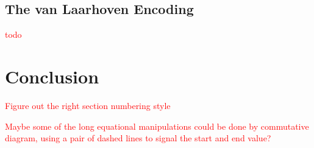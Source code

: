 \documentclass[11pt,a4paper]{article}
\makeatletter
\theoremstyle{plain}
\newtheorem{theorem}{Theorem}[subsection]
\theoremstyle{definition}
\newcommand{\C}{\mathscr{C}}
\newcommand{\id}{\mathrm{id}}
\newcommand{\hto}{\ensuremath{\,\mathaccent\shortmid\rightarrow\,}}
\providecommand{\leftsquigarrow}{%
  \mathrel{\mathpalette\reflect@squig\relax}%
}
\newcommand{\reflect@squig}[2]{%
  \reflectbox{$\m@th#1\rightsquigarrow$}%
}
\newcommand{\todo}[1]{\textcolor{red}{\small #1}}
\makeatother
\begin{document}
%
%
%

\subsection{The van Laarhoven Encoding}
\todo{todo}

\section{Conclusion}

\todo{Figure out the right section numbering style}

\todo{Maybe some of the long equational manipulations could be done by commutative diagram, using a pair of dashed lines to signal the start and end value?}



\end{document}

